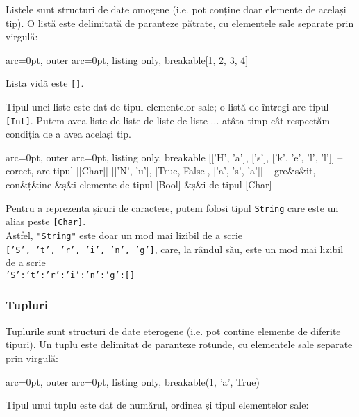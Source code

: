 Listele sunt structuri de date omogene (i.e. pot conține doar elemente de același tip). O listă este delimitată de paranteze pătrate, cu elementele sale separate prin virgulă:

\begin{tcblisting}{ arc=0pt, outer arc=0pt, listing only, breakable}[1, 2, 3, 4]
\end{tcblisting}


Lista vidă este \texttt{[]}.

Tipul unei liste este dat de tipul elementelor sale; o listă de întregi are tipul \texttt{[Int]}. Putem avea liste de liste de liste de liste ... atâta timp cât respectăm condiția de a avea același tip.

\begin{tcblisting}{ arc=0pt, outer arc=0pt, listing only, breakable}
[['H', 'a'], ['s'], ['k', 'e', 'l', 'l']] -- corect, are tipul [[Char]]
[['N', 'u'], [True, False], ['a', 's', 'a']] -- gre&ș&it, con&ț&ine &ș&i elemente de tipul [Bool] &ș&i de tipul [Char]

\end{tcblisting}


\begin{tcolorbox}[colback=blue!10, colframe=blue!20]
Pentru a reprezenta șiruri de caractere, putem folosi tipul \texttt{String} care este un alias peste \texttt{[Char]}.\\Astfel, \texttt{"String"} este doar un mod mai lizibil de a scrie\\ \texttt{['S', 't', 'r', 'i', 'n', 'g']}, care, la rândul său, este un mod mai lizibil de a scrie\\\texttt{'S':'t':'r':'i':'n':'g':[]}
\end{tcolorbox}

\subsubsection*{ Tupluri }

Tuplurile sunt structuri de date eterogene (i.e. pot conține elemente de diferite tipuri). Un tuplu este delimitat de paranteze rotunde, cu elementele sale separate prin virgulă:

\begin{tcblisting}{ arc=0pt, outer arc=0pt, listing only, breakable}(1, 'a', True)
\end{tcblisting}


Tipul unui tuplu este dat de numărul, ordinea și tipul elementelor sale:

